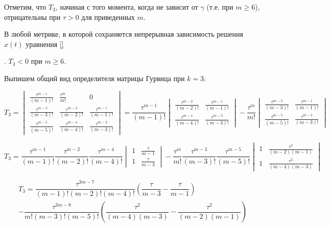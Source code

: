 Отметим, что $T_3$, начиная с того момента, когда не зависит от $\gamma$ (т.е. при $m \geq 6$), отрицательны при $\tau>0$ для приведенных $m$.

В любой метрике, в которой сохраняется непрерывная зависимость решения $x(t)$ уравнения \ref{}

. $T_3 < 0$ при $m \geq 6$.

Выпишем общий вид определителя матрицы Гурвица при $k=3$:

\begin{equation*}
T_3 = 
\begin{vmatrix}
\frac{\tau^{m-1}}{(m-1)!} & \frac{\tau^{m}}{m!} & 0\\
\frac{\tau^{m-3}}{(m-3)!} & \frac{\tau^{m-2}}{(m-2)!} & \frac{\tau^{m-1}}{(m-1)!}\\
\frac{\tau^{m-5}}{(m-5)!} & \frac{\tau^{m-4}}{(m-4)!} & \frac{\tau^{m-3}}{(m-3)!}
\end{vmatrix} =
\dfrac{\tau^{m-1}}{(m-1)!}
\begin{vmatrix}
\frac{\tau^{m-2}}{(m-2)!} & \frac{\tau^{m-1}}{(m-1)!}\\
\frac{\tau^{m-4}}{(m-4)!} & \frac{\tau^{m-3}}{(m-3)!}
\end{vmatrix}
- \dfrac{\tau^{m}}{m!}
\begin{vmatrix}
\frac{\tau^{m-3}}{(m-3)!} & \frac{\tau^{m-1}}{(m-1)!}\\
\frac{\tau^{m-5}}{(m-5)!} & \frac{\tau^{m-3}}{(m-3)!}
\end{vmatrix}
\end{equation*}

\begin{equation*}
T_3 =
\dfrac{\tau^{m-1}}{(m-1)!} \dfrac{\tau^{m-2}}{(m-2)!} \dfrac{\tau^{m-4}}{(m-4)!}
\begin{vmatrix}
1 & \frac{\tau}{m-1}\\
1 & \frac{\tau}{m-3}
\end{vmatrix}
- \dfrac{\tau^{m}}{m!} \dfrac{\tau^{m-3}}{(m-3)!} \dfrac{\tau^{m-5}}{(m-5)!}
\begin{vmatrix}
1 & \frac{\tau^2}{(m-2)(m-1)}\\
1 & \frac{\tau^2}{(m-4)(m-3)}
\end{vmatrix}
\end{equation*}



\begin{multline*}
T_3 = \dfrac{\tau^{3m-7}}{(m-1)!(m-2)!(m-4)!} \left( \dfrac{\tau}{m-3} - \dfrac{\tau}{m-1} \right) \\ - \dfrac{\tau^{3m-8}}{m!(m-3)!(m-5)!} \left( \dfrac{\tau^2}{(m-4)(m-3)} - \dfrac{\tau^2}{(m-2)(m-1)} \right)
\end{multline*}

